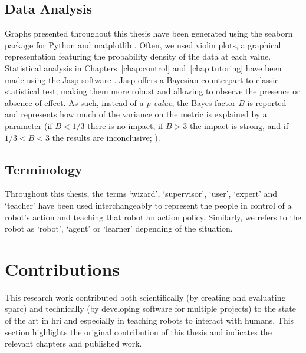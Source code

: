 \subsection{Data Analysis}
Graphs presented throughout this thesis have been generated using the seaborn package for Python and matplotlib \citep{waskom2017seaborn}. Often, we used violin plots, a graphical representation featuring the probability density of the data at each value. Statistical analysis in Chapters~\ref{chap:control} and~\ref{chap:tutoring} have been made using the Jasp software \citep{jasp2018}. Jasp offers a Bayesian counterpart to classic statistical test, making them more robust and allowing to observe the presence or absence of effect. As such, instead of a \emph{p-value}, the Bayes factor $B$ is reported and represents how much of the variance on the metric is explained by a parameter (if $B < 1/3$ there is no impact, if $B > 3$ the impact is strong, and if $1/3<B<3$ the results are inconclusive; \citealt{jeffreys1998theory,dienes2011bayesian}). 

\subsection{Terminology}

Throughout this thesis, the terms `wizard', `supervisor', `user', `expert' and `teacher' have been used interchangeably to represent the people in control of a robot's action and teaching that robot an action policy. Similarly, we refers to the robot as `robot', `agent' or `learner' depending of the situation.
%
%

\section{Contributions}\label{sec:intro_contr}

This research work contributed both scientifically (by creating and evaluating \gls{sparc}) and technically (by developing software for multiple projects) to the state of the art in \gls{hri} and especially in teaching robots to interact with humans. This section highlights the original contribution of this thesis and indicates the relevant chapters and published work.

